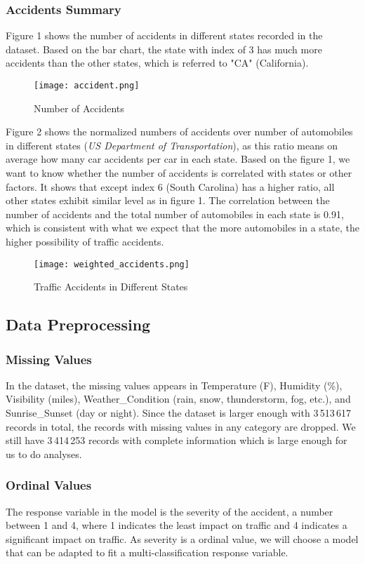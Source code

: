 \documentclass[twocolumn]{article}
\begin{document}
\subsubsection{Accidents Summary}
Figure 1 shows the number of accidents in different states recorded in the dataset. Based on the bar chart, the state with index of 3 has much more accidents than the other states, which is referred to "CA" (California).


\begin{figure}[h]
    \centering
    \texttt{[image: accident.png]}
    \caption{Number of Accidents}
\end{figure}

Figure 2 shows the normalized numbers of accidents over number of automobiles in different states (\textit{US Department of Transportation}), as this ratio means on average how many car accidents per car in each state. Based on the figure 1, we want to know whether the number of accidents is correlated with states or other factors. It shows that except index 6 (South Carolina) has a higher ratio, all other states exhibit similar level as in figure 1. The correlation between the number of accidents and the total number of automobiles in each state is 0.91, which is consistent with what we expect that the more automobiles in a state, the higher possibility of traffic accidents.

\begin{figure}[h]
    \centering
    \texttt{[image: weighted\_accidents.png]}
    \caption{Traffic Accidents in Different States}
\end{figure} 


\subsection{Data Preprocessing}
\subsubsection{Missing Values}
In the dataset, the missing values appears in Temperature (F), Humidity (\%), Visibility (miles), Weather\_Condition (rain, snow, thunderstorm, fog, etc.), and Sunrise\_Sunset (day or night). Since the dataset is larger enough with 3\,513\,617 records in total, the records with missing values in any category are dropped. We still have 3\,414\,253 records with complete information which is large enough for us to do analyses.

\subsubsection{Ordinal Values}
The response variable in the model is the severity of the accident, a number between 1 and 4, where 1 indicates the least impact on traffic and 4 indicates a significant impact on traffic. As severity is a ordinal value, we will choose a model that can be adapted to fit a multi-classification response variable.
\end{document}
